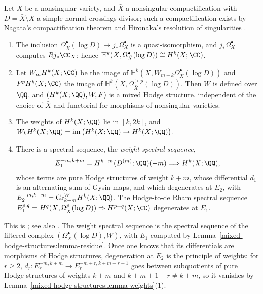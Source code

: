 \begin{theorem}[Deligne]\label{mixed-hodge-structures:theorem-smooth}
Let $X$ be a nonsingular variety, and $\bar X$ a nonsingular compactification with $D = \bar X \setminus X$ a simple normal crossings divisor; such a compactification exists by Nagata's compactification
theorem and Hironaka's resolution of singularities \cite{hironaka-1964}.
\begin{enumerate}
\item The inclusion $\Omega^\bullet_{\bar X}(\log D) \to j_*\Omega^\bullet_X$ is a quasi-isomorphism, and $j_*\Omega^\bullet_X$ computes $Rj_*\CC_X$; hence
$\mathbb{H}^k(\bar X, \Omega^\bullet_{\bar X}(\log D)) \cong H^k(X; \CC)$.
\item Let $W_mH^k(X; \CC)$ be the image of $\mathbb{H}^k(\bar X, W_{m-k}\Omega^\bullet_{\bar X}(\log D))$ and $F^pH^k(X; \CC)$ the image of $\mathbb{H}^k(\bar X, \Omega^{\geq p}_{\bar X}(\log D))$. Then $W$ is
defined over $\QQ$, and $(H^k(X; \QQ), W, F)$ is a mixed Hodge structure, independent of the choice of $\bar X$ and functorial for morphisms of nonsingular varieties.
\item The weights of $H^k(X; \QQ)$ lie in $[k, 2k]$, and $W_kH^k(X; \QQ) = \operatorname{im}\big(H^k(\bar X; \QQ) \to H^k(X; \QQ)\big)$.
\item There is a spectral sequence, the \emph{weight spectral sequence},
\[
E_1^{-m,k+m} = H^{k-m}(D^{(m)}; \QQ)(-m) \Longrightarrow H^k(X; \QQ),
\]
whose terms are pure Hodge structures of weight $k + m$, whose differential $d_1$ is an alternating sum of Gysin maps, and which degenerates at $E_2$, with $E_2^{-m,k+m} = \mathrm{Gr}^W_{k+m}H^k(X; \QQ)$.
The Hodge-to-de Rham spectral sequence $E_1^{p,q} = H^q(\bar X, \Omega^p_{\bar X}(\log D)) \Rightarrow H^{p+q}(X; \CC)$ degenerates at $E_1$.
\end{enumerate}
\end{theorem}

This is \cite[Section 3]{deligne-hodge-2}; see also \cite[Chapter 4]{peters-steenbrink}. The weight spectral sequence is the spectral sequence of the filtered complex $(\Omega^\bullet_{\bar X}(\log D), W)$,
with $E_1$ computed by Lemma~\ref{mixed-hodge-structures:lemma-residue}. Once one knows that its differentials are morphisms of Hodge structures, degeneration at $E_2$ is the principle of weights: for
$r \geq 2$, $d_r \colon E_r^{-m,k+m} \to E_r^{-m+r,k+m-r+1}$ goes between subquotients of pure Hodge structures of weights $k + m$ and $k + m + 1 - r \neq k + m$, so it vanishes by
Lemma~\ref{mixed-hodge-structures:lemma-weights}(1).

